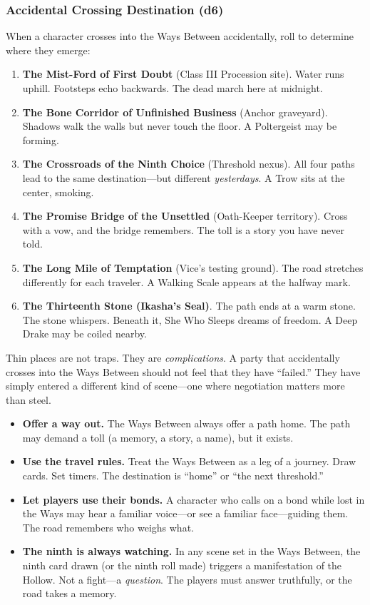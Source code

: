 \subsubsection*{Accidental Crossing Destination (d6)}
\label{sec:ways-between-thin-destinations}
When a character crosses into the Ways Between accidentally, roll to determine where they emerge:
\begin{enumerate}
\item \textbf{The Mist-Ford of First Doubt} (Class III Procession site). Water runs uphill. Footsteps echo backwards. The dead march here at midnight.
\item \textbf{The Bone Corridor of Unfinished Business} (Anchor graveyard). Shadows walk the walls but never touch the floor. A Poltergeist may be forming.
\item \textbf{The Crossroads of the Ninth Choice} (Threshold nexus). All four paths lead to the same destination---but different \emph{yesterdays}. A Trow sits at the center, smoking.
\item \textbf{The Promise Bridge of the Unsettled} (Oath-Keeper territory). Cross with a vow, and the bridge remembers. The toll is a story you have never told.
\item \textbf{The Long Mile of Temptation} (Vice's testing ground). The road stretches differently for each traveler. A Walking Scale appears at the halfway mark.
\item \textbf{The Thirteenth Stone (Ikasha's Seal)}. The path ends at a warm stone. The stone whispers. Beneath it, She Who Sleeps dreams of freedom. A Deep Drake may be coiled nearby.
\end{enumerate}

\begin{tcolorbox}[colback=black!3,colframe=black!40!white,title={GM Guidance: Thin Places as Pressure, Not Punishment},breakable]
Thin places are not traps. They are \emph{complications}. A party that accidentally crosses into the Ways Between should not feel that they have ``failed.'' They have simply entered a different kind of scene---one where negotiation matters more than steel.

\begin{itemize}
\item \textbf{Offer a way out.} The Ways Between always offer a path home. The path may demand a toll (a memory, a story, a name), but it exists.
\item \textbf{Use the travel rules.} Treat the Ways Between as a leg of a journey. Draw cards. Set timers. The destination is ``home'' or ``the next threshold.''
\item \textbf{Let players use their bonds.} A character who calls on a bond while lost in the Ways may hear a familiar voice---or see a familiar face---guiding them. The road remembers who weighs what.
\item \textbf{The ninth is always watching.} In any scene set in the Ways Between, the ninth card drawn (or the ninth roll made) triggers a manifestation of the Hollow. Not a fight---a \emph{question}. The players must answer truthfully, or the road takes a memory.
\end{itemize}
\end{tcolorbox}

